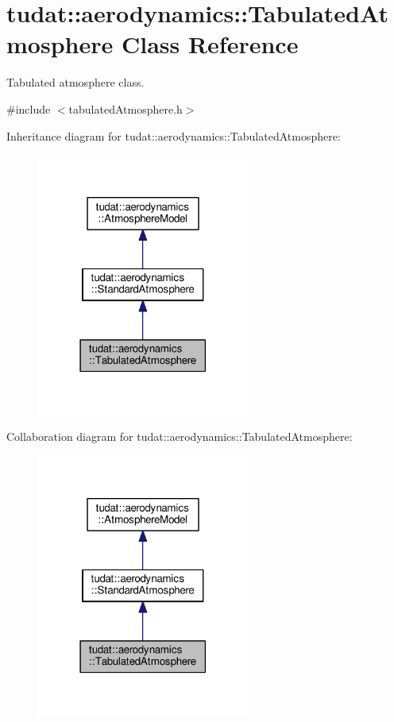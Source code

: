 \hypertarget{classtudat_1_1aerodynamics_1_1TabulatedAtmosphere}{}\section{tudat\+:\+:aerodynamics\+:\+:Tabulated\+Atmosphere Class Reference}
\label{classtudat_1_1aerodynamics_1_1TabulatedAtmosphere}


Tabulated atmosphere class.  




{\ttfamily \#include $<$tabulated\+Atmosphere.\+h$>$}



Inheritance diagram for tudat\+:\+:aerodynamics\+:\+:Tabulated\+Atmosphere\+:
\nopagebreak
\begin{figure}[H]
\begin{center}
\leavevmode
\includegraphics[width=198pt]{classtudat_1_1aerodynamics_1_1TabulatedAtmosphere__inherit__graph}
\end{center}
\end{figure}


Collaboration diagram for tudat\+:\+:aerodynamics\+:\+:Tabulated\+Atmosphere\+:
\nopagebreak
\begin{figure}[H]
\begin{center}
\leavevmode
\includegraphics[width=198pt]{classtudat_1_1aerodynamics_1_1TabulatedAtmosphere__coll__graph}
\end{center}
\end{figure}
